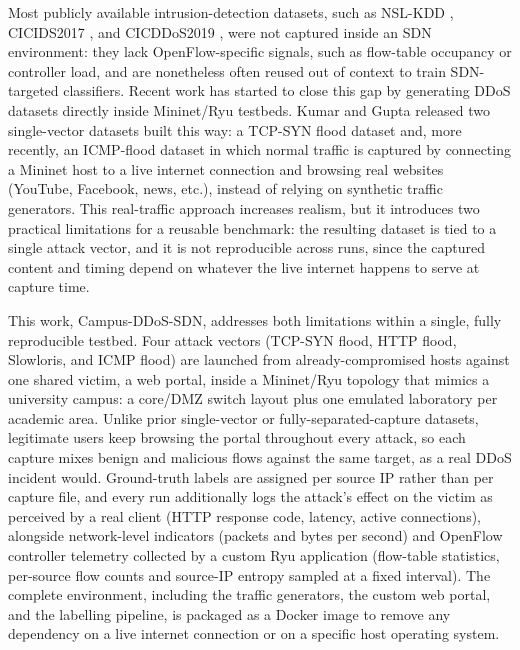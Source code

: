 \documentclass[ASNA,twocolumn]{USG}
\begin{document}
Most publicly available intrusion-detection datasets, such as
NSL-KDD \citep{tavallaee2009nslkdd}, CICIDS2017
\citep{sharafaldin2018cicflowmeter}, and CICDDoS2019
\citep{sharafaldin2019cicddos2019}, were not captured inside an SDN
environment: they lack OpenFlow-specific signals, such as flow-table
occupancy or controller load, and are nonetheless often reused out of
context to train SDN-targeted classifiers. Recent work has started to
close this gap by generating DDoS datasets directly inside Mininet/Ryu
testbeds. Kumar and Gupta released two single-vector datasets built
this way: a TCP-SYN flood dataset \citep{kumar2025synflood} and, more
recently, an ICMP-flood dataset \citep{kumar2026icmpfloodsdn} in which
normal traffic is captured by connecting a Mininet host to a live
internet connection and browsing real websites (YouTube, Facebook,
news, etc.), instead of relying on synthetic traffic generators. This
real-traffic approach increases realism, but it introduces two
practical limitations for a reusable benchmark: the resulting dataset
is tied to a single attack vector, and it is not reproducible across
runs, since the captured content and timing depend on whatever the
live internet happens to serve at capture time.

This work, Campus-DDoS-SDN, addresses both limitations within a
single, fully reproducible testbed. Four attack vectors (TCP-SYN
flood, HTTP flood, Slowloris, and ICMP flood) are launched from
already-compromised hosts against one shared victim, a web portal,
inside a Mininet/Ryu topology that mimics a university campus: a
core/DMZ switch layout plus one emulated laboratory per academic
area. Unlike prior single-vector or fully-separated-capture datasets,
legitimate users keep browsing the portal throughout every attack, so
each capture mixes benign and malicious flows against the same
target, as a real DDoS incident would. Ground-truth labels are
assigned per source IP rather than per capture file, and every run
additionally logs the attack's effect on the victim as perceived by a
real client (HTTP response code, latency, active connections),
alongside network-level indicators (packets and bytes per second) and
OpenFlow controller telemetry collected by a custom Ryu application
(flow-table statistics, per-source flow counts and source-IP entropy
sampled at a fixed interval). The complete environment, including the
traffic generators, the custom web portal, and the labelling
pipeline, is packaged as a Docker image to remove any dependency on a
live internet connection or on a specific host operating system.
\end{document}
